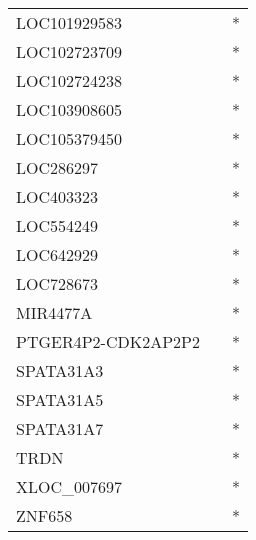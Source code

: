 \begin{tabular}{lcc}
LOC101929583       &                &          * \\
LOC102723709       &                &          * \\
LOC102724238       &                &          * \\
LOC103908605       &                &          * \\
LOC105379450       &                &          * \\
LOC286297          &                &          * \\
LOC403323          &                &          * \\
LOC554249          &                &          * \\
LOC642929          &                &          * \\
LOC728673          &                &          * \\
MIR4477A           &                &          * \\
PTGER4P2-CDK2AP2P2 &                &          * \\
SPATA31A3          &                &          * \\
SPATA31A5          &                &          * \\
SPATA31A7          &                &          * \\
TRDN               &                &          * \\
XLOC\_007697        &                &          * \\
ZNF658             &                &          * \\
\bottomrule
\end{tabular}
